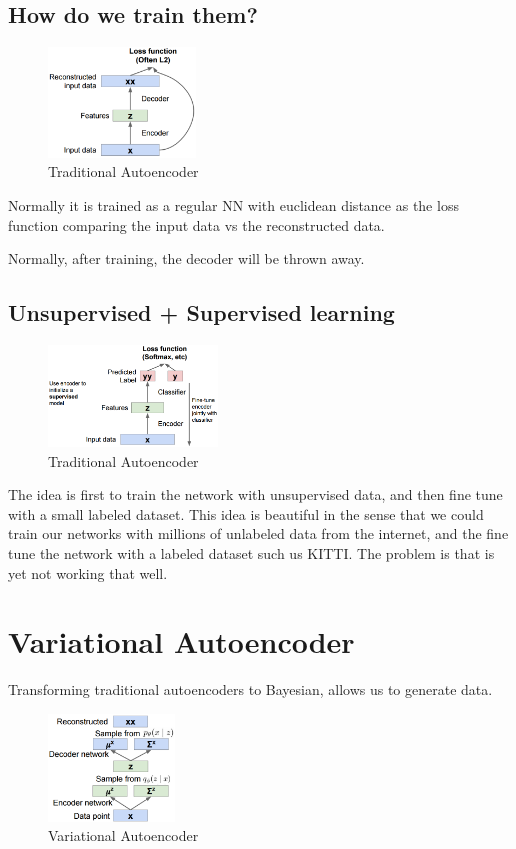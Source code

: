 \subsection*{How do we train them?}
\begin{figure}[!htb]
  \centering
  \includegraphics[width=0.35\textwidth]{Images/autoencoders/2.png}
  \caption{Traditional Autoencoder}
\end{figure}
Normally it is trained as a regular NN with euclidean distance as the loss function comparing the input data vs the reconstructed data. 

Normally, after training, the decoder will be thrown away.


\subsection*{Unsupervised + Supervised learning}
\begin{figure}[!htb]
  \centering
  \includegraphics[width=0.4\textwidth]{Images/autoencoders/3.png}
  \caption{Traditional Autoencoder}
\end{figure}
The idea is first to train the network with unsupervised data, and then fine tune with a small labeled dataset. This idea is beautiful in the sense that we could train our networks with millions of unlabeled data from the internet, and the fine tune the network with a labeled dataset such us KITTI. The problem is that is yet not working that well.

\section{Variational Autoencoder}
Transforming traditional autoencoders to Bayesian, allows us to generate data.

\begin{figure}[!htb]
  \centering
  \includegraphics[width=0.3\textwidth]{Images/autoencoders/4.png}
  \caption{Variational Autoencoder}
\end{figure}

